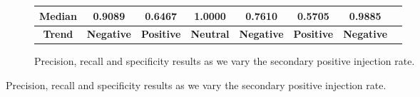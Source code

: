 \begin{figure}[ht]
\begin{subfigure}{\textwidth}
{\begin{tabular}{cccccccc}
                \textbf{Median}                        & 0.9089                                        & 0.6467                                         & 1.0000               & 0.7610             & 0.5705            & 0.9885               \\
                \midrule
                \textbf{Trend}                         & \textbf{Negative}                             & \textbf{Positive}                              & \textbf{Neutral}     & \textbf{Negative}  & \textbf{Positive} & \textbf{Negative}    \\
                \bottomrule
            \end{tabular}%
        }

        \caption{Precision, recall and specificity results as we vary the secondary positive injection rate.}
        \label{subfig:ratio_test_combined}
    \end{subfigure}

    \vspace{5pt}


\end{figure}
